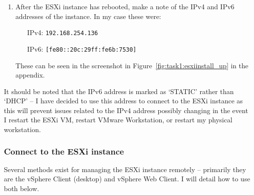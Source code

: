 \begin{enumerate}[resume*=task1methodology]
\begin{enumerate}[label=(\alph*)]
      \item After the ESXi instance has rebooted, make a note of the IPv4 and IPv6 addresses of the instance. In my case these were:
      \begin{itemize}[leftmargin=1.5cm]
        \item [IPv4:] \texttt{192.168.254.136}
        \item [IPv6:] \texttt{[fe80::20c:29ff:fe6b:7530]}
      \end{itemize}
      These can be seen in the screenshot in Figure~\ref{fig:task1:esxiinstall_up} in the  appendix.
    \end{enumerate}
\end{enumerate}

\noindent It should be noted that the IPv6 address is marked as `STATIC' rather than `DHCP' -- I have decided to use this address to connect to the ESXi instance as this will prevent issues related to the IPv4 address possibly changing in the event I restart the ESXi VM, restart VMware Workstation, or restart my physical workstation.

\subsubsection*{Connect to the ESXi instance}
Several methods exist for managing the ESXi instance remotely -- primarily they are the vSphere Client (desktop) and vSphere Web Client. I will detail how to use both below.

